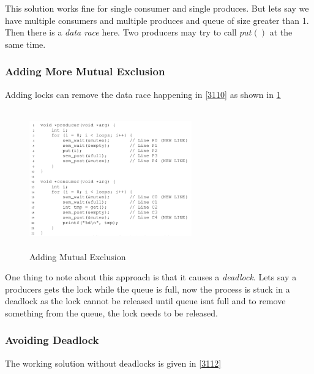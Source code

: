 This solution works fine for single consumer and single produces. But lets say
we have multiple consumers and multiple produces and queue of size greater than
1. Then there is a \textit{data race} here. Two producers may try to call
$put()$ at the same time.\\

\subsubsection{Adding More Mutual Exclusion}

Adding locks can remove the data race happening in \ref{3110} as shown in 
\ref{3111}

\begin{figure}[h!]
    \label{3111}
    \begin{center}
        \includegraphics[width=7cm, height=6cm]{img/3111.png}
        \caption{Adding Mutual Exclusion}
    \end{center}
\end{figure}

One thing to note about this approach is that it causes a \textit{deadlock}. 
Lets say a producers gets the lock while the queue is full, now the process
is stuck in a deadlock as the lock cannot be released until queue isnt full and
to remove something from the queue, the lock needs to be released.

\subsubsection{Avoiding Deadlock}

The working solution without deadlocks is given in \ref{3112}

